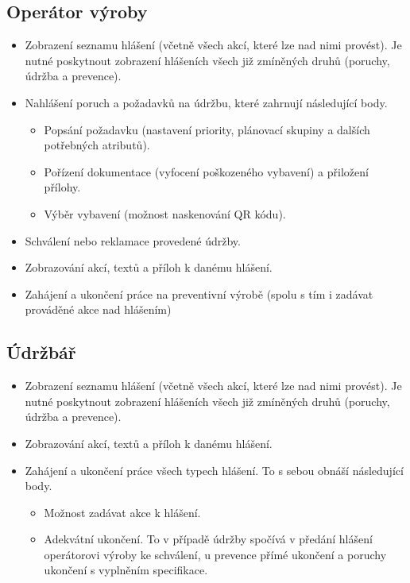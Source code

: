 \documentclass[thesis=M,czech]{FITthesis}[2012/06/26]
\begin{document}
\subsection{Operátor výroby}
\begin{itemize}
	\item
	Zobrazení seznamu hlášení (včetně všech akcí, které lze nad nimi provést). Je nutné poskytnout zobrazení hlášeních všech již zmíněných druhů (poruchy, údržba a prevence).
	\item
	Nahlášení poruch a požadavků na údržbu, které zahrnují následující body.
	\begin{itemize}
		\item
		Popsání požadavku (nastavení priority, plánovací skupiny a dalších potřebných atributů).
		\item
		Pořízení dokumentace (vyfocení poškozeného vybavení) a přiložení přílohy.
		\item
		Výběr vybavení (možnost naskenování QR kódu).
	\end{itemize} 
    \item
	Schválení nebo reklamace provedené údržby.
	\item
	Zobrazování akcí, textů a příloh k danému hlášení.
	\item
	Zahájení a ukončení práce na preventivní výrobě (spolu s tím i zadávat prováděné akce nad hlášením)
\end{itemize} 

\subsection{Údržbář}
\begin{itemize}
	\item
	Zobrazení seznamu hlášení (včetně všech akcí, které lze nad nimi provést). Je nutné poskytnout zobrazení hlášeních všech již zmíněných druhů (poruchy, údržba a prevence).
	\item
	Zobrazování akcí, textů a příloh k danému hlášení.
	\item
	Zahájení a ukončení práce všech typech hlášení. To s sebou obnáší následující body.
	\begin{itemize}
		\item
		Možnost zadávat akce k hlášení.
		\item
		Adekvátní ukončení. To v případě údržby spočívá v předání hlášení operátorovi výroby ke schválení, u prevence přímé ukončení a poruchy ukončení s vyplněním specifikace.
	\end{itemize} 
\end{itemize} 
\end{document}
